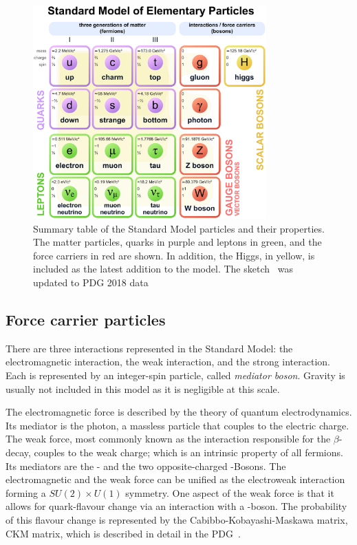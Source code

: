 \begin{figure}
	\centering
	\includegraphics[width=0.8\textwidth]{figures_SM/standard_model.eps}
	\caption[Standard Model of Particle Physics]{Summary table of the Standard Model particles and their properties. The matter particles, quarks in purple and leptons in green, and the force carriers in red are shown. In addition, the Higgs, in yellow, is included as the latest addition to the model.  The sketch~\cite{standard_model} was updated to PDG 2018 data~\cite{PDG}}
	\label{fig:sm}
\end{figure}



\subsection{Force carrier particles}

There are three interactions represented in the Standard Model: the electromagnetic interaction, the weak interaction, and the strong interaction. Each is represented by an integer-spin particle, called \emph{mediator boson}. Gravity is usually not included in this model as it is negligible at this scale. 

The electromagnetic force is described by the theory of quantum electrodynamics. Its mediator is the photon, a massless particle that couples to the electric charge.
The weak force, most commonly known as the interaction responsible for the $\beta$-decay, couples to the weak charge; which is an intrinsic property of all fermions. Its mediators are the \PZ- and the two opposite-charged \PW-Bosons.
The electromagnetic and the weak force can be unified as the electroweak interaction forming a $SU(2) \times U(1)$ symmetry.
One aspect of the weak force is that it allows for quark-flavour change via an interaction with a \PW-boson. The probability of this flavour change is represented by the Cabibbo-Kobayashi-Maskawa matrix, CKM matrix, which is described in detail in the PDG~\cite{PDG}.

